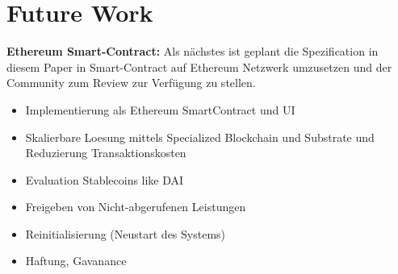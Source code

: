 \section{Future Work}

\textbf{Ethereum Smart-Contract:} Als nächstes ist geplant die Spezification in diesem Paper in Smart-Contract auf Ethereum Netzwerk umzusetzen und der Community zum Review zur Verfügung zu stellen.



\begin{itemize}
\item Implementierung als Ethereum SmartContract und UI
\item Skalierbare Loesung mittels Specialized Blockchain und Substrate und Reduzierung Transaktionskosten
\item Evaluation Stablecoins like DAI
\item Freigeben von Nicht-abgerufenen Leistungen
\item Reinitialisierung (Neustart des Systems)
\item Haftung, Gavanance
\end{itemize}
